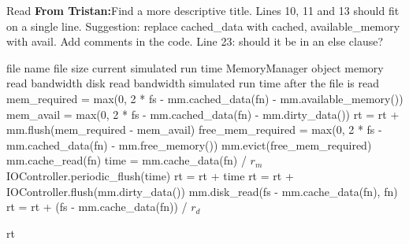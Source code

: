 \documentclass[conference]{IEEEtran}
\newcommand{\Desc}[2]{\State \makebox[2em][l]{#1}#2}
\newcommand{\tristan}[1]{\color{orange}\textbf{From Tristan:}#1\color{black}}
\begin{document}
			\begin{algorithm}\caption{Read \tristan{Find a more descriptive title. Lines 10, 11 and 13 should fit on a single line. Suggestion: replace cached\_data with cached, available\_memory with avail.
				Add comments in the code. Line 23: should it be in an else clause? } }\label{alg:read}
				\small
				\begin{algorithmic}[1]
					\Input
        				\Desc{fn}{file name}
        				\Desc{fs}{file size}
						\Desc{rt}{current simulated run time}
						\Desc{mm}{MemoryManager object}
						\Desc{$r_m$}{memory read bandwidth}
						\Desc{$r_d$}{disk read bandwidth}
   					\EndInput
   					\Output
						\Desc{rt}{simulated run time after the file is read}
   					\EndOutput
					\State mem\_required = max(0, 2 * fs - mm.cached\_data(fn) - 
					mm.available\_memory()) 
					\State mem\_avail = max(0, 2 * fs - mm.cached\_data(fn) - 
					mm.dirty\_data())
					\State rt = rt +  mm.flush(mem\_required - 
					mem\_avail)	
					\State free\_mem\_required = max(0, 2 * fs - mm.cached\_data(fn) - 
					mm.free\_memory())
					\State mm.evict(free\_mem\_required) 
    					\State mm.cache\_read(fn) 
    						\State time = mm.cache\_data(fn) / $r_m$
    						\State IOController.periodic\_flush(time) 
							\State rt = rt + time
						\EndIf
					\EndIf
						\State rt = rt + IOController.flush(mm.dirty\_data())
						\State mm.disk\_read(fs - mm.cache\_data(fn), fn)
    					\State rt = rt + (fs - mm.cache\_data(fn)) / $r_d$
					\EndIf					
					
					\State \Return rt
					
				\end{algorithmic}
			\end{algorithm}			
			
\end{document}
